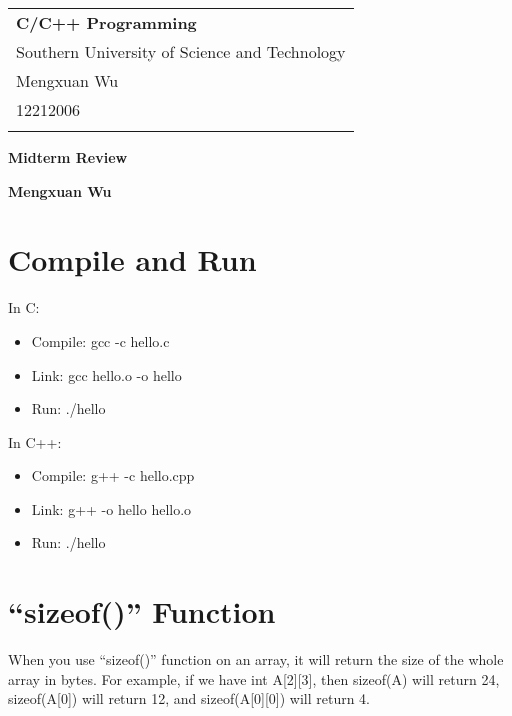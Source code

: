 \documentclass[a4paper,12pt]{article}
\begin{document}
\thispagestyle{empty} %

\begin{tabular}{p{15.5cm}}
{\large \bf C/C++ Programming} \\
Southern University of Science and Technology \\ Mengxuan Wu \\ 12212006 \\
\hline
\\
\end{tabular}

\vspace*{0.3cm} %

\begin{center}
	{\Large \bf Midterm Review}
	\vspace{2mm}

	{\bf Mengxuan Wu}
		
\end{center}  

\vspace{0.4cm}

\section{Compile and Run}

In C:
\begin{itemize}
	\item Compile: gcc -c hello.c
	\item Link: gcc hello.o -o hello
	\item Run: ./hello
\end{itemize}

In C++:
\begin{itemize}
	\item Compile: g++ -c hello.cpp
	\item Link: g++ -o hello hello.o
	\item Run: ./hello
\end{itemize}

\section*{``sizeof()'' Function}

When you use ``sizeof()'' function on an array, it will return the size of the whole array in bytes. 
For example, if we have int A[2][3], then sizeof(A) will return 24, sizeof(A[0]) will return 12, and sizeof(A[0][0]) will return 4.
\end{document}
